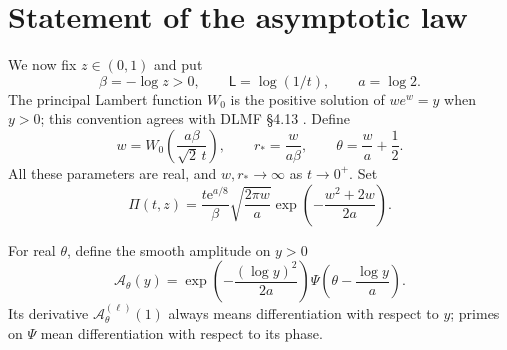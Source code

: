 \documentclass[11pt,a4paper,oneside,openany]{book}
\numberwithin{equation}{chapter}
\theoremstyle{definition}
\theoremstyle{remark}
\newcommand{\e}{\mathrm e}
\newcommand{\Lsad}{\mathsf L}
\begin{document}
\section{Statement of the asymptotic law}
We now fix \(z\in(0,1)\) and put
\begin{equation}
 \beta=-\log z>0,\qquad \Lsad=\log(1/t),\qquad a=\log2.
 \label{nd:eq:parameters}
\end{equation}
The principal Lambert function \(W_0\) is the positive solution of
\(we^w=y\) when \(y>0\); this convention agrees with DLMF
\S4.13 \cite{dlmf413}. Define
\begin{equation}
 w=W_0\left(\frac{a\beta}{\sqrt2\,t}\right),\qquad
 r_* =\frac{w}{a\beta},\qquad
 \theta=\frac wa+\frac12.
 \label{nd:eq:saddleparams}
\end{equation}
All these parameters are real, and \(w,r_*\to\infty\) as \(t\to0^+\).
Set
\begin{equation}
 \Pi(t,z)=\frac{t\e^{a/8}}{\beta}
         \sqrt{\frac{2\pi w}{a}}
         \exp\left(-\frac{w^2+2w}{2a}\right).
 \label{nd:eq:prefactor}
\end{equation}

For real \(\theta\), define the smooth amplitude on \(y>0\)
\begin{equation}
 \mathcal A_\theta(y)=
      \exp\left(-\frac{(\log y)^2}{2a}\right)
      \Psi\left(\theta-\frac{\log y}{a}\right).
 \label{nd:eq:Atheta}
\end{equation}
Its derivative \(\mathcal A_\theta^{(\ell)}(1)\) always means differentiation
with respect to \(y\); primes on \(\Psi\) mean differentiation with respect
to its phase.
\end{document}

